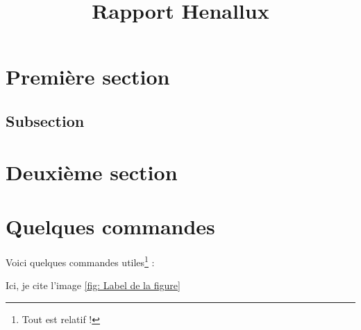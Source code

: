 \documentclass{rapportHenallux}
\title{Rapport Henallux} %
\begin{document}



        
\fairemarges %
\fairepagedegarde %
\tabledematieres %



\section{Première section} 

\lipsum[3-4]%

\subsection{Subsection}

\lipsum[3-4] %

\section{Deuxième section}

\lipsum[3-5] %


\section{Quelques commandes}

Voici quelques commandes utiles\footnote{Tout est relatif !} :


Ici, je cite l'image \ref{fig: Label de la figure}
\end{document}
